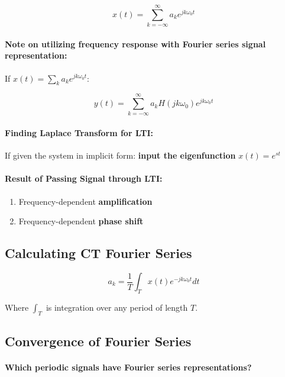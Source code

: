 \documentclass[a4paper,12pt]{report}
\begin{document}
\begin{equation}
x(t) = \sum_{k=-\infty}^{\infty} a_k e^{jk\omega_0 t}
\end{equation}

\paragraph{Note on utilizing frequency response with Fourier series signal representation: } If $x(t) = \sum_{k}^{} a_k e^{jk\omega_0 t}$: 

\begin{equation}
y(t) = \sum_{k=-\infty}^{\infty} a_k H(jk\omega_0) e^{jk\omega_0 t}
\end{equation}

\paragraph{Finding Laplace Transform for LTI: } If given the system in implicit form: \textbf{input the eigenfunction} $x(t) = e^{st}$

\paragraph{Result of Passing Signal through LTI: } 
\begin{enumerate}
\item Frequency-dependent \textbf{amplification} 
\item Frequency-dependent \textbf{phase shift} 
\end{enumerate}

\subsection{Calculating CT Fourier Series}

\begin{equation}
a_k = \frac{1}{T} \int_{T} x(t) e^{-jk\omega_0 t} dt
\end{equation}

Where $\int_{T}$ is integration over any period of length $T$.



\subsection{Convergence of Fourier Series}

\paragraph{Which periodic signals have Fourier series representations? } 
\end{document}

